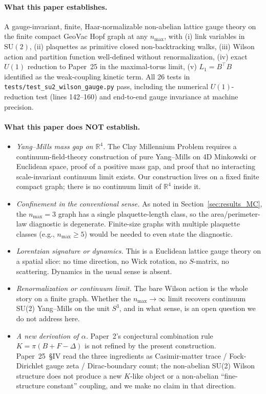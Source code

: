 \documentclass[11pt]{article}
\begin{document}
\paragraph*{What this paper establishes.}  A gauge-invariant, finite,
Haar-normalizable non-abelian lattice gauge theory on the finite
compact GeoVac Hopf graph at any $n_{\max}$, with (i) link variables
in $\mathrm{SU}(2)$, (ii) plaquettes as primitive closed
non-backtracking walks, (iii) Wilson action and partition function
well-defined without renormalization, (iv) exact $U(1)$ reduction to
Paper~25 in the maximal-torus limit, (v) $L_1 = B^{\top} B$
identified as the weak-coupling kinetic term.  All 26 tests in
\texttt{tests/test\_su2\_wilson\_gauge.py} pass, including the
numerical $U(1)$-reduction test (lines 142--160) and end-to-end gauge
invariance at machine precision.

\paragraph*{What this paper does NOT establish.}
\begin{itemize}
\item \emph{Yang--Mills mass gap on $\mathbb{R}^4$.}  The Clay
  Millennium Problem requires a continuum-field-theory construction
  of pure Yang--Mills on 4D Minkowski or Euclidean space, proof of a
  positive mass gap, and proof that no interacting scale-invariant
  continuum limit exists.  Our construction lives on a fixed finite
  compact graph; there is no continuum limit of $\mathbb{R}^4$ inside
  it.
\item \emph{Confinement in the conventional sense.}  As noted in
  Section~\ref{sec:results_MC}, the $n_{\max} = 3$ graph has a single
  plaquette-length class, so the area/perimeter-law diagnostic is
  degenerate.  Finite-size graphs with multiple plaquette classes
  (e.g., $n_{\max} \geq 5$) would be needed to even state the
  diagnostic.
\item \emph{Lorentzian signature or dynamics.}  This is a Euclidean
  lattice gauge theory on a spatial slice: no time direction, no
  Wick rotation, no $S$-matrix, no scattering.  Dynamics in the
  usual sense is absent.
\item \emph{Renormalization or continuum limit.}  The bare Wilson
  action is the whole story on a finite graph.  Whether the
  $n_{\max} \to \infty$ limit recovers continuum SU(2) Yang--Mills
  on the unit $S^3$, and in what sense, is an open question we do
  not address here.
\item \emph{A new derivation of $\alpha$.}  Paper~2's conjectural
  combination rule $K = \pi(B + F - \Delta)$ is not refined by the
  present construction.  Paper~25~\S IV read the three ingredients as
  Casimir-matter trace / Fock-Dirichlet gauge zeta / Dirac-boundary
  count; the non-abelian SU(2) Wilson structure does not produce a
  new $K$-like object or a non-abelian ``fine-structure constant''
  coupling, and we make no claim in that direction.
\end{itemize}
\end{document}

